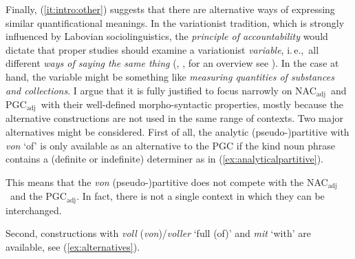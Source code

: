 \documentclass[USenglish]{article}
\newcommand{\ie}{i.\,e.,}
\newcommand{\Sub}[1]{\ensuremath{\mathrm{_{#1}}}}
\newcommand{\NACa}{NAC\Sub{adj}}
\newcommand{\PGCa}{PGC\Sub{adj}}
\begin{document}
Finally, (\ref{it:intro:other}) suggests that there are alternative ways of expressing similar quantificational meanings.
In the variationist tradition, which is strongly influenced by Labovian sociolinguistics, the \textit{principle of accountability} would dictate that proper studies should examine a variationist \textit{variable}, \ie\ all different \textit{ways of saying the same thing} (\citealp{Labov1966}, \citealp{Labov1969}, for an overview see \citealp{Tagliamonte2012}).
In the case at hand, the variable might be something like \textit{measuring quantities of substances and collections}.
I argue that it is fully justified to focus narrowly on \NACa\ and \PGCa\ with their well-defined morpho-syntactic properties, mostly because the alternative constructions are not used in the same range of contexts.
Two major alternatives might be considered.
First of all, the analytic (pseudo-)partitive with \textit{von} `of' is only available as an alternative to the PGC if the kind noun phrase contains a (definite or indefinite) determiner as in (\ref{ex:analyticalpartitive}).

\begin{exe}
  \ex\label{ex:analyticalpartitive} 
  \begin{xlist}
  \end{xlist}
\end{exe}

This means that the \textit{von} (pseudo-)partitive does not compete with the \NACa\ and the \PGCa.
In fact, there is not a single context in which they can be interchanged. 

Second, constructions with \textit{voll} (\textit{von})\slash\textit{voller} `full (of)' and \textit{mit} `with' are available, see (\ref{ex:alternatives}).
\end{document}
